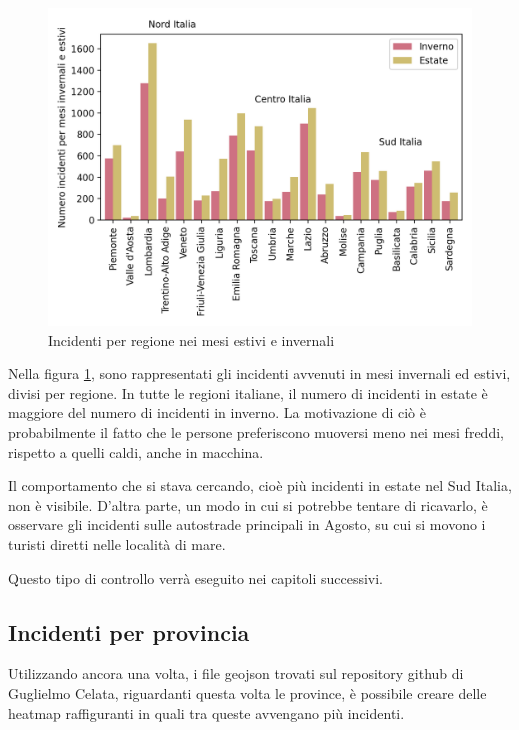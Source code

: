\documentclass[a4paper,12pt]{report}
\begin{document}
\begin{figure}
    \includegraphics[width=\linewidth]{../src/incidenti/incidenti_aci/mappe_regioni/estate_inverno.png}
    \caption{Incidenti per regione nei mesi estivi e invernali}
    \label{fig:estate-inverno}
\end{figure}

Nella figura \ref{fig:estate-inverno}, sono rappresentati gli incidenti avvenuti 
in mesi invernali ed estivi, divisi per regione. 
In tutte le regioni italiane, il numero di incidenti in estate è maggiore del 
numero di incidenti in inverno. 
La motivazione di ciò è probabilmente il fatto che 
le persone preferiscono muoversi meno nei mesi freddi, rispetto a quelli caldi, 
anche in macchina.

Il comportamento che si stava cercando, cioè più incidenti in estate nel 
Sud Italia, non è visibile. 
D'altra parte, un modo in cui si potrebbe tentare di ricavarlo, è osservare gli 
incidenti sulle autostrade principali in Agosto, su cui si movono i turisti diretti 
nelle località di mare.

Questo tipo di controllo verrà eseguito nei capitoli successivi.

\subsection{Incidenti per provincia}

Utilizzando ancora una volta, i file geojson trovati sul repository github di 
Guglielmo Celata, riguardanti questa volta le province, 
è possibile creare delle heatmap raffiguranti in quali tra queste avvengano più 
incidenti.
\end{document}
